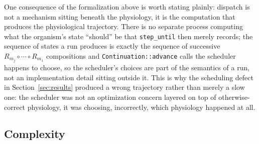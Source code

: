 \documentclass[11pt]{article}
\begin{document}
One consequence of the formalization above is worth stating plainly: dispatch is not a mechanism sitting beneath the physiology, it is the computation that produces the physiological trajectory. There is no separate process computing what the organism's state ``should'' be that \texttt{step\_until} then merely records; the sequence of states a run produces is exactly the sequence of successive $R_{m_j} \circ \cdots \circ R_{m_1}$ compositions and \texttt{Continuation::advance} calls the scheduler happens to choose, so the scheduler's choices are part of the semantics of a run, not an implementation detail sitting outside it. This is why the scheduling defect in Section~\ref{sec:results} produced a wrong trajectory rather than merely a slow one: the scheduler was not an optimization concern layered on top of otherwise-correct physiology, it was choosing, incorrectly, which physiology happened at all.

\subsection{Complexity}
\end{document}
